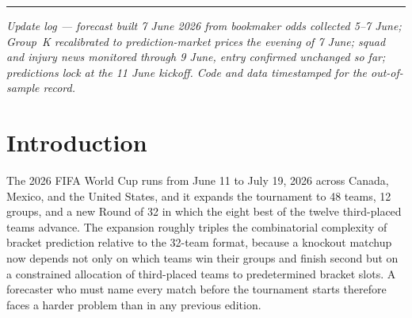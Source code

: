 \documentclass[11pt,letterpaper]{article}
\begin{document}
\begin{center}
\rule{0.6\textwidth}{0.4pt}
\end{center}

\begin{center}
\footnotesize\itshape
Update log --- forecast built 7 June 2026 from bookmaker odds collected 5--7 June;
Group~K recalibrated to prediction-market prices the evening of 7 June;
squad and injury news monitored through 9 June, entry confirmed unchanged so far;
predictions lock at the 11 June kickoff. Code and data timestamped for the out-of-sample record.
\end{center}

\section{Introduction}

The 2026 FIFA World Cup runs from June 11 to July 19, 2026 across Canada, Mexico, and the United States, and it expands the tournament to 48 teams, 12 groups, and a new Round of 32 in which the eight best of the twelve third-placed teams advance. The expansion roughly triples the combinatorial complexity of bracket prediction relative to the 32-team format, because a knockout matchup now depends not only on which teams win their groups and finish second but on a constrained allocation of third-placed teams to predetermined bracket slots. A forecaster who must name every match before the tournament starts therefore faces a harder problem than in any previous edition.
\end{document}
